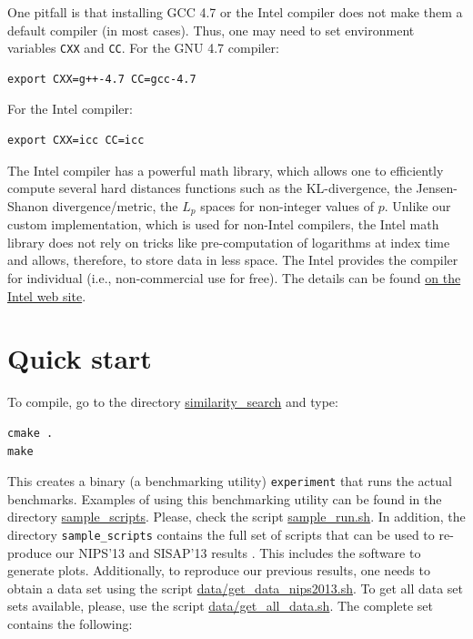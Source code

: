 \documentclass[runningheads,a4paper]{llncs}
\newcommand{\ttt}[1]{\texttt{#1}}
\begin{document}
{One pitfall is that installing GCC 4.7 or the Intel compiler does not make them a default compiler (in most cases).
Thus, one may need to set environment variables \ttt{CXX} and \ttt{CC}.
For the GNU 4.7 compiler:
\begin{verbatim}
export CXX=g++-4.7 CC=gcc-4.7 
\end{verbatim}
For the Intel compiler:
\begin{verbatim}
export CXX=icc CC=icc 
\end{verbatim}

The Intel compiler has a powerful math library, 
which allows one to efficiently compute several hard distances functions
such as the KL-divergence, the Jensen-Shanon divergence/metric, 
the $L_p$ spaces for non-integer values of $p$.
Unlike our custom implementation, which is used for non-Intel compilers,
the Intel math library does not rely on tricks like pre-computation of logarithms at index time and
allows, therefore, to store data in less space. 
The Intel provides the compiler for individual (i.e., non-commercial use for free).
The details can be found \href{http://software.intel.com/en-us/non-commercial-software-development}{on the Intel web site}.


\section{Quick start}
To compile, go to the directory \href{https://github.com/searchivarius/NonMetricSpaceLib/tree/master/similarity_search}{similarity\_search} and type:  
\begin{verbatim}
cmake .  
make   
\end{verbatim}
This creates a binary (a benchmarking utility) \ttt{experiment} that runs the actual benchmarks. 
Examples of using this benchmarking utility can be found in the directory \href{https://github.com/searchivarius/NonMetricSpaceLib/tree/master/sample_scripts}{sample\_scripts}. 
Please, check the script \href{https://github.com/searchivarius/NonMetricSpaceLib/tree/master/sample_scripts/sample_run.sh}{sample\_run.sh}. 
In addition, the directory \ttt{sample\_scripts} contains the full set of scripts that can be used to re-produce our NIPS'13 and SISAP'13 results \cite{Boytsov_and_Bilegsaikhan:sisap2013,Boytsov_and_Bilegsaikhan:nips2013}.
This includes the software to generate plots. 
Additionally, to reproduce our previous results, one needs to obtain a data set using the script 
\href{https://github.com/searchivarius/NonMetricSpaceLib/tree/master/data/get_data_nips2013.sh}{data/get\_data\_nips2013.sh}. 
To get all data set sets available, please, use the script
\href{https://github.com/searchivarius/NonMetricSpaceLib/tree/master/data/get_all_data.sh}{data/get\_all\_data.sh}. 
The complete set contains the following:

}
\end{document}
